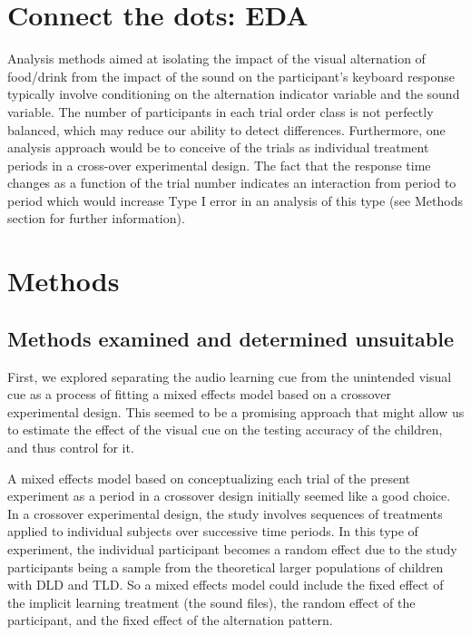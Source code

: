 \documentclass[
  letterpaper,
]{report}
\begin{document}
\hypertarget{connect-the-dots-eda}{%
\section{Connect the dots: EDA}\label{connect-the-dots-eda}}

Analysis methods aimed at isolating the impact of the visual alternation
of food/drink from the impact of the sound on the participant's keyboard
response typically involve conditioning on the alternation indicator
variable and the sound variable. The number of participants in each
trial order class is not perfectly balanced, which may reduce our
ability to detect differences. Furthermore, one analysis approach would
be to conceive of the trials as individual treatment periods in a
cross-over experimental design. The fact that the response time changes
as a function of the trial number indicates an interaction from period
to period which would increase Type I error in an analysis of this type
(see Methods section for further information).

\hypertarget{methods}{%
\section{Methods}\label{methods}}

\hypertarget{methods-examined-and-determined-unsuitable}{%
\subsection{Methods examined and determined
unsuitable}\label{methods-examined-and-determined-unsuitable}}

First, we explored separating the audio learning cue from the unintended
visual cue as a process of fitting a mixed effects model based on a
crossover experimental design. This seemed to be a promising approach
that might allow us to estimate the effect of the visual cue on the
testing accuracy of the children, and thus control for it.

A mixed effects model based on conceptualizing each trial of the present
experiment as a period in a crossover design initially seemed like a
good choice. In a crossover experimental design, the study involves
sequences of treatments applied to individual subjects over successive
time periods. In this type of experiment, the individual participant
becomes a random effect due to the study participants being a sample
from the theoretical larger populations of children with DLD and TLD. So
a mixed effects model could include the fixed effect of the implicit
learning treatment (the sound files), the random effect of the
participant, and the fixed effect of the alternation pattern.
\end{document}
